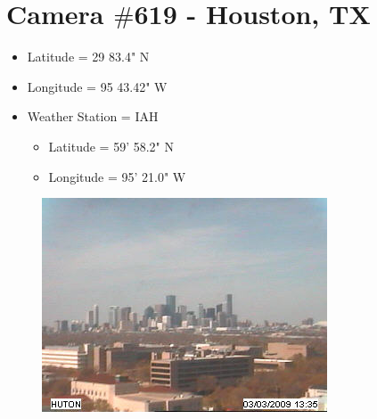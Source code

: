 \section{Camera $\#$619 - Houston, TX}
\begin{itemize}
	\item Latitude = 29 83.4" N
	\item Longitude = 95 43.42" W
	\item Weather Station = IAH
	\begin{itemize}
		\item Latitude = 59' 58.2" N
		\item Longitude = 95' 21.0" W
	\end{itemize}
\end{itemize}
 \begin{figure}[ht]
		\centering
		\includegraphics{figures/619.jpg}
\end{figure}